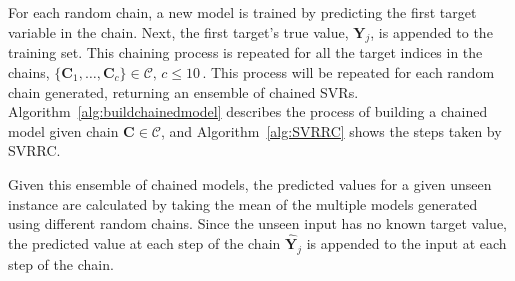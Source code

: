 \documentclass[reqno]{vcuthesis}
\numberwithin{equation}{chapter}
\begin{document}
For each random chain, a new model is trained by predicting the first target variable in the chain. Next, the first target's true value, $\bm Y_j$, is appended to the training set. This chaining process is repeated for all the target indices in the chains, $\{\bm C_1, \ldots, \bm C_c\} \in \mathcal{C}, \, c \leq 10 \,$. This process will be repeated for each random chain generated, returning an ensemble of chained SVRs. Algorithm~\ref{alg:buildchainedmodel} describes the process of building a chained model given chain $\bm C \in \mathcal{C}$, and Algorithm~\ref{alg:SVRRC} shows the steps taken by SVRRC. 

Given this ensemble of chained models, the predicted values for a given unseen instance are calculated by taking the mean of the multiple models generated using different random chains. Since the unseen input has no known target value, the predicted value at each step of the chain $\hat{\bm Y}_j$ is appended to the input at each step of the chain. 
\end{document}
